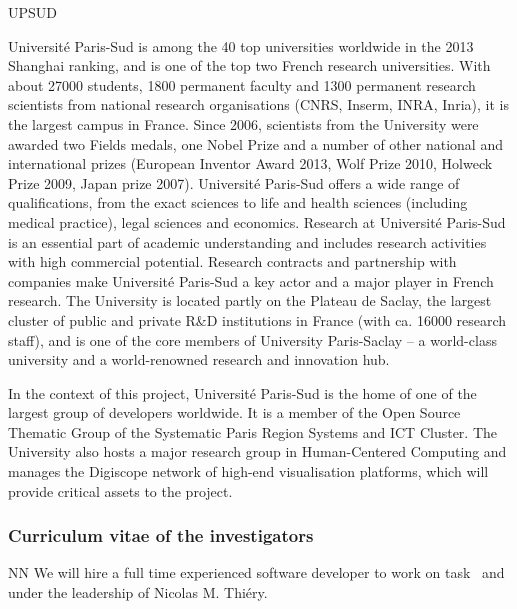 \begin{sitedescription}{UPSUD} \label{desc:ParisSud}

Université Paris-Sud is among the 40 top universities worldwide in the
2013 Shanghai ranking, and is one of the top two French research
universities. With about 27000 students, 1800 permanent faculty
and 1300 permanent research scientists from national research
organisations (CNRS, Inserm, INRA, Inria), it is the largest campus in
France. Since 2006, scientists from the University were awarded two
Fields medals, one Nobel Prize and a number of other national and international prizes
(European Inventor Award 2013, Wolf Prize 2010, Holweck Prize 2009,
Japan prize 2007).  Université Paris-Sud offers a
wide range of qualifications, from the exact sciences to life and health
sciences (including medical practice), legal sciences and economics. 
Research at Université Paris-Sud is an essential part of academic understanding 
and includes research activities with high commercial potential. 
Research contracts and partnership with companies make
Université Paris-Sud a key actor and a major player in French
research.  The University is located partly on the Plateau de Saclay,
the largest cluster of public and private R\&D institutions in France
(with ca. 16000 research staff), and is one of the core members of 
University Paris-Saclay – a world-class university and a
world-renowned research and innovation hub.

In the context of this project, Université Paris-Sud is the
home of one of the largest group of \Sage developers worldwide.
It is a member of the Open Source Thematic Group of the Systematic
Paris Region Systems and ICT Cluster. 
The University also hosts a major research group in Human-Centered Computing
and manages the Digiscope network of high-end visualisation platforms,
which will provide critical assets to the project.

\subsubsection*{Curriculum vitae of the investigators}





\begin{participant}[type=res,PM=21]{NN}
  We will hire a full time experienced software developer to work on
  task~ and~ %
  under the leadership of Nicolas M. Thiéry.


\end{participant}
\end{sitedescription}
